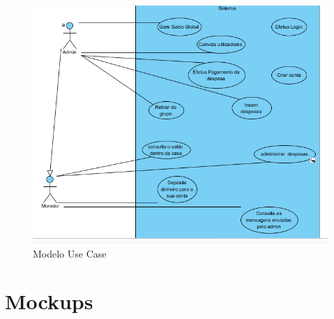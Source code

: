 \begin{figure}[htb!]
	\centering
	\includegraphics[scale=0.7]{usecase1}  
	\caption{Modelo Use Case}  
\end{figure}


\newpage
\section{Mockups}




